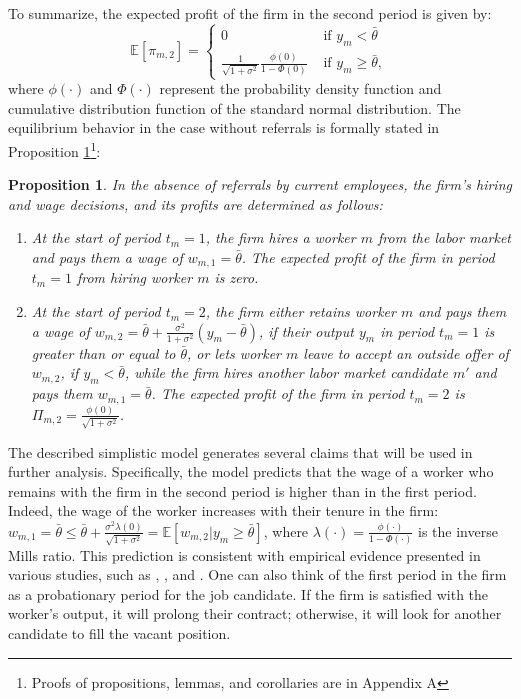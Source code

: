 \documentclass[12pt]{article}
\newtheorem{proposition}{Proposition}
\begin{document}
To summarize, the expected profit of the firm in the second period is given by:
\begin{equation}
    \mathbb{E}[\pi_{m,2}]= 
    \begin{cases}
        0 & \text{ if } y_m < \bar{\theta}\\
        \frac{1}{\sqrt{1 + \sigma^2}}\frac{\phi(0)}{1-\Phi(0)} & \text{ if } y_m \geq \bar{\theta},
    \end{cases}
\end{equation}
where $\phi(\cdot)$ and $\Phi(\cdot)$ represent the probability density function and cumulative distribution function of the standard normal distribution. The equilibrium behavior in the case without referrals is formally stated in Proposition \ref{prop:eq_no_ref}\footnote{Proofs of propositions, lemmas, and corollaries are in Appendix A}:

\begin{proposition}\label{prop:eq_no_ref}
In the absence of referrals by current employees, the firm's hiring and wage decisions, and its profits are determined as follows:
    \begin{enumerate}[label={\roman*})]
        \item At the start of period $t_m = 1$, the firm hires a worker $m$ from the labor market and pays them a wage of $w_{m,1} = \bar{\theta}$. The expected profit of the firm in period $t_m = 1$ from hiring worker $m$ is zero.
        \item At the start of period $t_m = 2$, the firm either retains worker $m$ and pays them a wage of $w_{m,2} = \bar{\theta}+ \frac{\sigma^2}{1+\sigma^2}(y_m-\bar{\theta})$, if their output $y_m$ in period $t_m = 1$ is greater than or equal to $\bar{\theta}$, or lets worker $m$ leave to accept an outside offer of $w_{m,2}$, if $y_m < \bar{\theta}$, while the firm hires another labor market candidate $m'$ and pays them $w_{m,1} = \bar{\theta}$. The expected profit of the firm in period $t_m = 2$ is $\Pi_{m,2} = \frac{\phi(0)}{\sqrt{1+\sigma^2}}$.
	\end{enumerate}
\end{proposition}

The described simplistic model generates several claims that will be used in further analysis. Specifically, the model predicts that the wage of a worker who remains with the firm in the second period is higher than in the first period. Indeed, the wage of the worker increases with their tenure in the firm: $w_{m,1} = \bar{\theta} \leq \bar{\theta}+ \frac{\sigma^2\lambda(0)}{\sqrt{1+\sigma^2}} = \mathbb{E}[w_{m,2}|y_m\geq \bar{\theta}]$, where $\lambda(\cdot) = \frac{\phi(\cdot)}{1-\Phi(\cdot)}$ is the inverse Mills ratio. This prediction is consistent with empirical evidence presented in various studies, such as \cite{medoff1980experience}, \cite{mincer1981labor}, and \cite{topel1991specific}. One can also think of the first period in the firm as a probationary period for the job candidate. If the firm is satisfied with the worker's output, it will prolong their contract; otherwise, it will look for another candidate to fill the vacant position.
\end{document}
